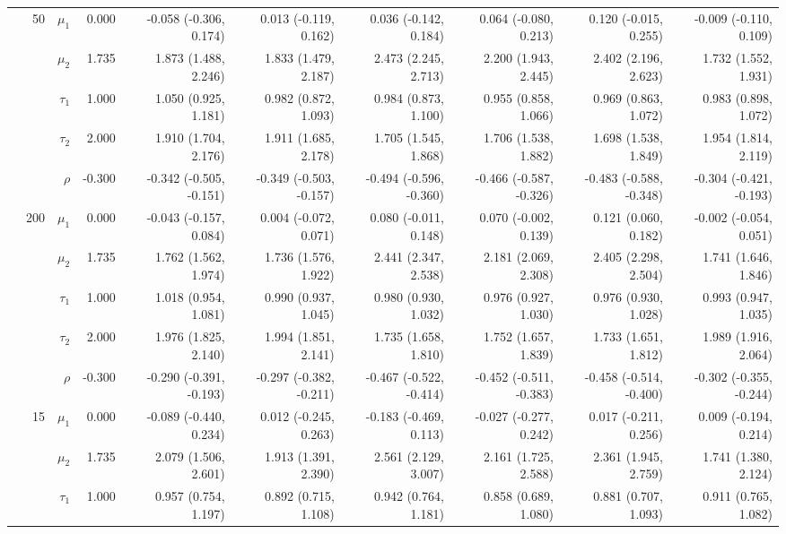 \documentclass[
]{article}
\begin{document}
\begin{table}
\begin{tabular}[t]{rrrrrrrrrr}
\addlinespace
 & 50 & $\mu_1$ & 0.000 & -0.058 (-0.306, 0.174) & 0.013 (-0.119, 0.162) & 0.036 (-0.142, 0.184) & 0.064 (-0.080, 0.213) & 0.120 (-0.015, 0.255) & -0.009 (-0.110, 0.109)\\
 &  & $\mu_2$ & 1.735 & 1.873 (1.488, 2.246) & 1.833 (1.479, 2.187) & 2.473 (2.245, 2.713) & 2.200 (1.943, 2.445) & 2.402 (2.196, 2.623) & 1.732 (1.552, 1.931)\\
 &  & $\tau_1$ & 1.000 & 1.050 (0.925, 1.181) & 0.982 (0.872, 1.093) & 0.984 (0.873, 1.100) & 0.955 (0.858, 1.066) & 0.969 (0.863, 1.072) & 0.983 (0.898, 1.072)\\
 &  & $\tau_2$ & 2.000 & 1.910 (1.704, 2.176) & 1.911 (1.685, 2.178) & 1.705 (1.545, 1.868) & 1.706 (1.538, 1.882) & 1.698 (1.538, 1.849) & 1.954 (1.814, 2.119)\\
 &  & $\rho$ & -0.300 & -0.342 (-0.505, -0.151) & -0.349 (-0.503, -0.157) & -0.494 (-0.596, -0.360) & -0.466 (-0.587, -0.326) & -0.483 (-0.588, -0.348) & -0.304 (-0.421, -0.193)\\
\addlinespace
 & 200 & $\mu_1$ & 0.000 & -0.043 (-0.157, 0.084) & 0.004 (-0.072, 0.071) & 0.080 (-0.011, 0.148) & 0.070 (-0.002, 0.139) & 0.121 (0.060, 0.182) & -0.002 (-0.054, 0.051)\\
 &  & $\mu_2$ & 1.735 & 1.762 (1.562, 1.974) & 1.736 (1.576, 1.922) & 2.441 (2.347, 2.538) & 2.181 (2.069, 2.308) & 2.405 (2.298, 2.504) & 1.741 (1.646, 1.846)\\
 &  & $\tau_1$ & 1.000 & 1.018 (0.954, 1.081) & 0.990 (0.937, 1.045) & 0.980 (0.930, 1.032) & 0.976 (0.927, 1.030) & 0.976 (0.930, 1.028) & 0.993 (0.947, 1.035)\\
 &  & $\tau_2$ & 2.000 & 1.976 (1.825, 2.140) & 1.994 (1.851, 2.141) & 1.735 (1.658, 1.810) & 1.752 (1.657, 1.839) & 1.733 (1.651, 1.812) & 1.989 (1.916, 2.064)\\
 &  & $\rho$ & -0.300 & -0.290 (-0.391, -0.193) & -0.297 (-0.382, -0.211) & -0.467 (-0.522, -0.414) & -0.452 (-0.511, -0.383) & -0.458 (-0.514, -0.400) & -0.302 (-0.355, -0.244)\\
\addlinespace
2 & 15 & $\mu_1$ & 0.000 & -0.089 (-0.440, 0.234) & 0.012 (-0.245, 0.263) & -0.183 (-0.469, 0.113) & -0.027 (-0.277, 0.242) & 0.017 (-0.211, 0.256) & 0.009 (-0.194, 0.214)\\
 &  & $\mu_2$ & 1.735 & 2.079 (1.506, 2.601) & 1.913 (1.391, 2.390) & 2.561 (2.129, 3.007) & 2.161 (1.725, 2.588) & 2.361 (1.945, 2.759) & 1.741 (1.380, 2.124)\\
 &  & $\tau_1$ & 1.000 & 0.957 (0.754, 1.197) & 0.892 (0.715, 1.108) & 0.942 (0.764, 1.181) & 0.858 (0.689, 1.080) & 0.881 (0.707, 1.093) & 0.911 (0.765, 1.082)\\

\end{tabular}
\end{table}
\end{document}
